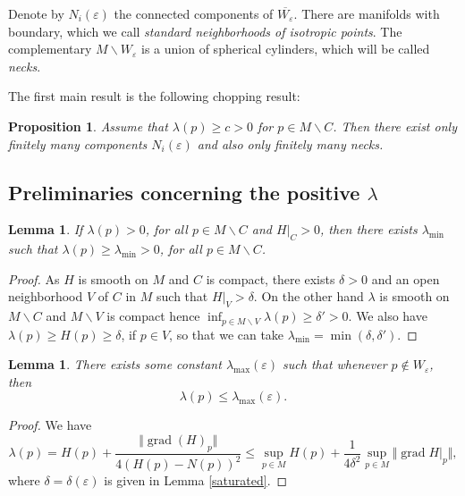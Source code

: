 \documentclass[10pt]{amsart}
\let\moins\smallsetminus
\DeclareMathOperator{\grad}{grad}
\let\parallel\Vert
\newtheorem{lemma}[theorem]{Lemma}
\newtheorem{proposition}[theorem]{Proposition}
\theoremstyle{definition}
\theoremstyle{remark}
\numberwithin{equation}{section}
\let\Subsection\subsection\let\Subsubsection\subsubsection
\begin{document}
Denote by $N_i(\varepsilon)$ the connected components of $\overline{W_{\varepsilon}}$. There are manifolds with boundary, which we call \emph{standard neighborhoods of isotropic points}. The complementary $M\moins W_{\varepsilon}$ is a union of spherical
cylinders, which will be called \emph{necks}.

The first main result is the following chopping result:

\begin{proposition}\label{essential}
Assume that $\lambda(p) \geq c >0$ for $p\in M\moins C$.
Then there exist only finitely many components $N_i(\varepsilon)$ and also only finitely many
necks.
\end{proposition}

\Subsection{Preliminaries concerning the positive $\lambda$}

\begin{lemma}\label{lowerlambda}
If $\lambda(p) >0$, for all $p\in M\moins C$ and $H|_C >0$, then there exists $\lambda_{\min}$ such that
$\lambda(p) \geq \lambda_{\min}>0$, for all $p\in M\moins C$.
\end{lemma}
\begin{proof}
As $H$ is smooth on $M$ and $C$ is compact, there exists $\delta >0$ and
an open neighborhood $V$ of $C$ in $M$
such that $H|_V > \delta$. On the other hand $\lambda$ is smooth on $M\moins C$ and
$M\moins V$ is compact hence $\inf_{p\in M\moins V} \lambda(p)\geq \delta' >0$. We also have
$\lambda(p)\geq H(p)\geq \delta$, if $p\in V$, so that we can take $\lambda_{\min}=\min(\delta,\delta')$.
\end{proof}

\begin{lemma}\label{upperlambda}
There exists some constant $\lambda_{\max}(\varepsilon)$ such that whenever $p\not\in W_{\varepsilon}$, then
\[ \lambda(p)\leq \lambda_{\max}(\varepsilon).\]
\end{lemma}
\begin{proof}
We have
\[ \lambda(p)= H(p)+\frac{\parallel \grad (H)_p\parallel}{4(H(p)-N(p))^2}
\leq \sup_{p\in M} H(p)+ \frac{1}{4\delta^2} \sup _{p\in M} \parallel \grad H|_p\parallel,\]
where $\delta=\delta(\varepsilon)$ is given in Lemma \ref{saturated}.
\end{proof}
\end{document}
